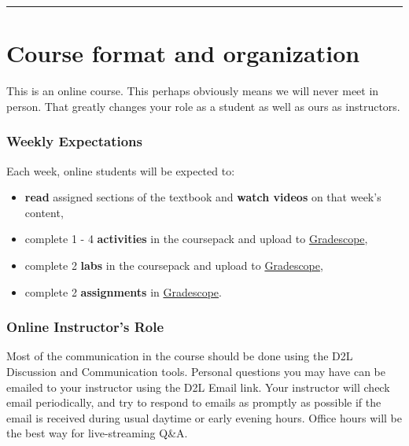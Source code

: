 \documentclass[
]{article}
\providecommand{\tightlist}{%
  \setlength{\itemsep}{0pt}\setlength{\parskip}{0pt}}
\begin{document}
\begin{center}\rule{0.5\linewidth}{0.5pt}\end{center}

\section{Course format and
organization}\label{course-format-and-organization}

This is an online course. This perhaps obviously means we will never
meet in person. That greatly changes your role as a student as well as
ours as instructors.

\subsubsection{Weekly Expectations}\label{weekly-expectations}

Each week, online students will be expected to:

\begin{itemize}
\tightlist
\item
  \textbf{read} assigned sections of the textbook and \textbf{watch
  videos} on that week's content,
\item
  complete 1 - 4 \textbf{activities} in the coursepack and upload to
  \href{https://www.gradescope.com/}{Gradescope},
\item
  complete 2 \textbf{labs} in the coursepack and upload to
  \href{https://www.gradescope.com/}{Gradescope},
\item
  complete 2 \textbf{assignments} in
  \href{https://www.gradescope.com/}{Gradescope}.
\end{itemize}

\subsubsection{Online Instructor's Role}\label{online-instructors-role}

Most of the communication in the course should be done using the D2L
Discussion and Communication tools. Personal questions you may have can
be emailed to your instructor using the D2L Email link. Your instructor
will check email periodically, and try to respond to emails as promptly
as possible if the email is received during usual daytime or early
evening hours. Office hours will be the best way for live-streaming
Q\&A.
\end{document}
